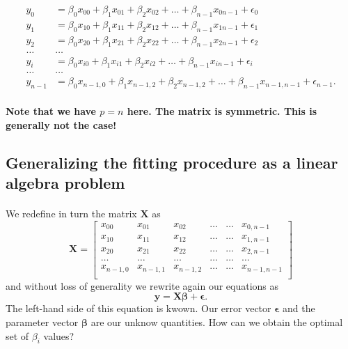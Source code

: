 \documentclass[%
oneside,                 %
final,                   %
10pt]{article}
\begin{document}
\begin{align*}
y_0&=\beta_0x_{00}+\beta_1x_{01}+\beta_2x_{02}+\dots+\beta_{n-1}x_{0n-1}+\epsilon_0\\
y_1&=\beta_0x_{10}+\beta_1x_{11}+\beta_2x_{12}+\dots+\beta_{n-1}x_{1n-1}+\epsilon_1\\
y_2&=\beta_0x_{20}+\beta_1x_{21}+\beta_2x_{22}+\dots+\beta_{n-1}x_{2n-1}+\epsilon_2\\
\dots & \dots \\
y_{i}&=\beta_0x_{i0}+\beta_1x_{i1}+\beta_2x_{i2}+\dots+\beta_{n-1}x_{in-1}+\epsilon_i\\
\dots & \dots \\
y_{n-1}&=\beta_0x_{n-1,0}+\beta_1x_{n-1,2}+\beta_2x_{n-1,2}+\dots+\beta_{n-1}x_{n-1,n-1}+\epsilon_{n-1}.\\
\end{align*}

\textbf{Note that we have $p=n$ here. The matrix is symmetric. This is generally not the case!}




\subsection*{Generalizing the fitting procedure as a linear algebra problem}

\paragraph{}
We redefine in turn the matrix $\bm{X}$ as
\[
\bm{X}=
\begin{bmatrix} 
x_{00}& x_{01} &x_{02}& \dots & \dots &x_{0,n-1}\\
x_{10}& x_{11} &x_{12}& \dots & \dots &x_{1,n-1}\\
x_{20}& x_{21} &x_{22}& \dots & \dots &x_{2,n-1}\\                      
\dots& \dots &\dots& \dots & \dots &\dots\\
x_{n-1,0}& x_{n-1,1} &x_{n-1,2}& \dots & \dots &x_{n-1,n-1}\\
\end{bmatrix} 
\]
and without loss of generality we rewrite again  our equations as
\[
\bm{y} = \bm{X}\bm{\beta}+\bm{\epsilon}.
\]
The left-hand side of this equation is kwown. Our error vector $\bm{\epsilon}$ and the parameter vector $\bm{\beta}$ are our unknow quantities. How can we obtain the optimal set of $\beta_i$ values?
\end{document}
